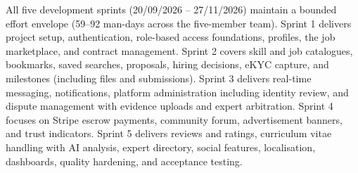 All five development sprints (20/09/2026 -- 27/11/2026) maintain a bounded effort envelope (59--92 man-days across the five-member team). Sprint 1 delivers project setup, authentication, role-based access foundations, profiles, the job marketplace, and contract management. Sprint 2 covers skill and job catalogues, bookmarks, saved searches, proposals, hiring decisions, eKYC capture, and milestones (including files and submissions). Sprint 3 delivers real-time messaging, notifications, platform administration including identity review, and dispute management with evidence uploads and expert arbitration. Sprint 4 focuses on Stripe escrow payments, community forum, advertisement banners, and trust indicators. Sprint 5 delivers reviews and ratings, curriculum vitae handling with AI analysis, expert directory, social features, localisation, dashboards, quality hardening, and acceptance testing.
